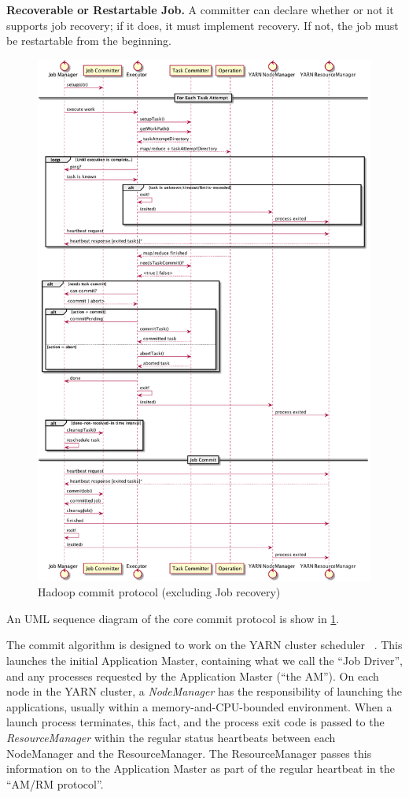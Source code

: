 \documentclass[conference]{IEEEtran}
\begin{document}
\textbf{Recoverable or Restartable Job.}
A committer can declare whether or not it supports job recovery;
if it does, it must implement recovery.
If not, the job must be restartable from the beginning.

\begin{figure}
  \centering
  \includegraphics[width=.8\textwidth]{commit-protocol.png}
  \caption{Hadoop commit protocol (excluding Job recovery)}
  \label{fig:commit-protocol}
\end{figure}

An UML sequence diagram of the core commit protocol is
show in \ref{fig:commit-protocol}.

The commit algorithm is designed to work on the YARN cluster scheduler
\ \cite{Vavilapalli2013}.
This launches the initial Application Master, containing what we call
the ``Job Driver'', and any processes requested by the Application Master
(``the AM'').
On each node in the YARN cluster, a \emph{NodeManager} has the responsibility
of launching the applications, usually within a memory-and-CPU-bounded
environment.
When a launch process terminates, this fact, and the process exit code
is passed to the \emph{ResourceManager} within the regular status heartbeats
between each NodeManager and the ResourceManager.
The ResourceManager passes this information on to the Application Master
as part of the regular heartbeat in the ``AM/RM protocol''.
\end{document}
